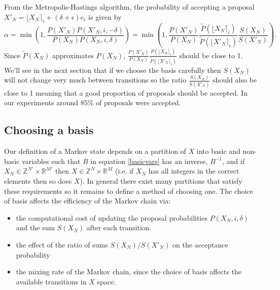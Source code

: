 \documentclass{article}
\begin{document}
From the Metropolis-Hastings algorithm, the probability of accepting a proposal $X'_N = \lfloor X_N \rceil_i + (\delta + \epsilon)e_i$ is given by
\[
\alpha = 
\min\left( 1, \frac{P(X'_N)P(X'_N, i, -\delta)}{P(X_N)P(X_N,i,\delta)} \right) =
\min\left(1, \frac{P(X'_N)}{P(X_N)} \frac{\tilde{P}(\lfloor X_N \rceil_i)}{\tilde{P}(\lfloor X'_N \rceil_i)}  \frac{S(X_N)}{S(X'_N)}\right).
\]
Since $\tilde{P}(X_N)$ approximates $P(X_N)$, $\frac{P(X'_N)}{P(X_N)} \frac{\tilde{P}(\lfloor X_N \rceil_i)}{\tilde{P}(\lfloor X'_N \rceil_i)}$ should be close to 1. We'll see in the next section that if we choose the basis carefully then $S(X_N)$ will not change very much between transitions so the ratio $ \frac{S(X_N)}{S(X'_N)}$ should also be close to 1 meaning that a good proportion of proposals should be accepted. In our experiments around $85\%$ of proposals were accepted.

\subsection{Choosing a basis}
\label{basis}
Our definition of a Markov state depends on a partition of $X$ into basic and non-basic variables such that $B$ in equation \eqref{basicvars} has an inverse, $B^{-1}$, and if $X_N \in \mathbb{Z}^{N'} \times \mathbb{R}^{M'}$ then $X \in \mathbb{Z}^{N} \times \mathbb{R}^{M}$ (i.e. if $X_N$ has all integers in the correct elements then so does $X$). In general there exist many partitions that satisfy these requirements so it remains to define a method of choosing one. The choice of basis affects the efficiency of the Markov chain via:
\begin{itemize}
\item the computational cost of updating the proposal probabilities $P(X_N,i,\delta)$ and the sum $S(X_N)$ after each transition.

\item the effect of the ratio of sums $S(X_N)/S(X'_N)$ on the acceptance probability

\item the mixing rate of the Markov chain, since the choice of basis affects the available transitions in $X$ space.
\end{itemize}
\end{document}
